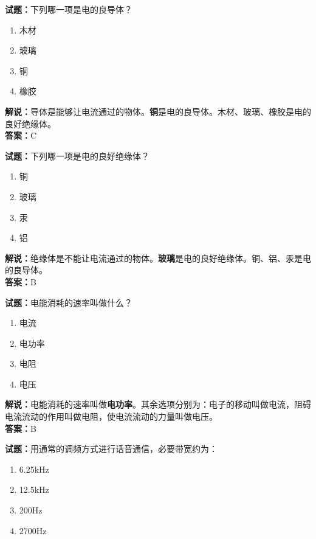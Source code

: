 \documentclass{ctexbook}
\begin{document}
\bigskip


\noindent\textbf{试题：}下列哪一项是电的良导体？

\begin{enumerate}[leftmargin=3em]
	\item 木材
	\item 玻璃
	\item 铜
	\item 橡胶
\end{enumerate}

\noindent\textbf{解说：}导体是能够让电流通过的物体。\textbf{铜}是电的良导体。木材、玻璃、橡胶是电的良好绝缘体。\\\noindent\textbf{答案：}C


\bigskip


\noindent\textbf{试题：}下列哪一项是电的良好绝缘体？

\begin{enumerate}[leftmargin=3em]
	\item 铜
	\item 玻璃
	\item 汞
	\item 铝
\end{enumerate}

\noindent\textbf{解说：}绝缘体是不能让电流通过的物体。\textbf{玻璃}是电的良好绝缘体。铜、铝、汞是电的良导体。\\\noindent\textbf{答案：}B


\bigskip


\noindent\textbf{试题：}电能消耗的速率叫做什么？

\begin{enumerate}[leftmargin=3em]
	\item 电流
	\item 电功率
	\item 电阻
	\item 电压
\end{enumerate}

\noindent\textbf{解说：}电能消耗的速率叫做\textbf{电功率}。其余选项分别为：电子的移动叫做电流，阻碍电流流动的作用叫做电阻，使电流流动的力量叫做电压。\\\noindent\textbf{答案：}B


\bigskip


\noindent\textbf{试题：}用通常的调频方式进行话音通信，必要带宽约为：

\begin{enumerate}[leftmargin=3em]
	\item 6.25kHz
	\item 12.5kHz
	\item 200Hz
	\item 2700Hz
\end{enumerate}
\end{document}
